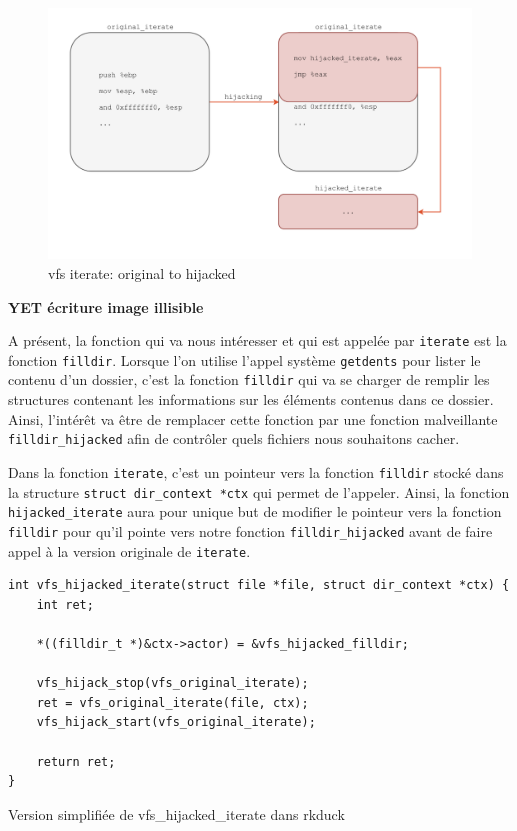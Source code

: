 \documentclass[11pt]{article}
\begin{document}
\begin{figure}[H] 
\begin{center}
\includegraphics[scale=0.5]{./img/vfs_iterate_original_to_hijacked.png}

\caption[dsfsdf]{vfs iterate: original to hijacked}
\end{center}
\end{figure}

\textbf{YET écriture image illisible}

        A présent, la fonction qui va nous intéresser et qui est appelée par \texttt{iterate} est la fonction \texttt{filldir}. Lorsque l'on utilise l'appel système \texttt{getdents} pour lister le contenu d'un dossier, c'est la fonction \texttt{filldir} qui va se charger de remplir les structures contenant les informations sur les éléments contenus dans ce dossier. Ainsi, l'intérêt va être de remplacer cette fonction par une fonction malveillante \texttt{filldir\_hijacked} afin de contrôler quels fichiers nous souhaitons cacher.

        Dans la fonction \texttt{iterate}, c'est un pointeur vers la fonction \texttt{filldir} stocké dans la structure \texttt{struct dir\_context *ctx} qui permet de l'appeler. Ainsi, la fonction \texttt{hijacked\_iterate} aura pour unique but de modifier le pointeur vers la fonction \texttt{filldir} pour qu'il pointe vers notre fonction \texttt{filldir\_hijacked} avant de faire appel à la version originale de \texttt{iterate}.\\

\begin{listing}[H]
\begin{verbatim}
int vfs_hijacked_iterate(struct file *file, struct dir_context *ctx) {
    int ret;

    *((filldir_t *)&ctx->actor) = &vfs_hijacked_filldir;

    vfs_hijack_stop(vfs_original_iterate);
    ret = vfs_original_iterate(file, ctx);
    vfs_hijack_start(vfs_original_iterate);

    return ret;
}
\end{verbatim}
\caption{Version simplifiée de vfs\_hijacked\_iterate dans rkduck}
\label{listing:3}
\end{listing}
\end{document}
